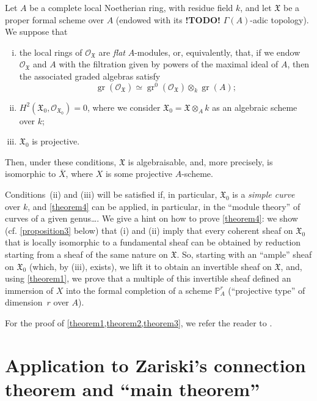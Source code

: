 \documentclass{article}
\theoremstyle{plain}
\newenvironment{theorem}[1]
  {\renewcommand\theinnercustomtheorem{#1}\innercustomtheorem}
  {\endinnercustomtheorem}
\theoremstyle{definition}
\newcommand{\sh}{\mathscr}
\newcommand{\fk}{\mathfrak}
\newcommand{\PP}{\mathbb{P}}
\DeclareMathOperator{\gr}{gr}
\newcommand{\todo}{\textbf{ !TODO! }}
\newcommand{\oldpage}[1]{\marginpar{\footnotesize$\Big\vert$ \textit{p.~#1}}}
\begin{document}
\begin{theorem}{4}
\label{theorem4}
  Let $A$ be a complete local Noetherian ring, with residue field $k$, and let $\fk{X}$ be a proper formal scheme over $A$ (endowed with its \todo $\Gamma(A)$-adic topology).
  We suppose that
  \begin{enumerate}[i.]
    \item the local rings of $\sh{O}_{\fk{X}}$ are \emph{flat} $A$-modules, or, equivalently, that, if we endow $\sh{O}_{\fk{X}}$ and $A$ with the filtration given by powers of the maximal ideal of $A$, then the associated graded algebras satisfy
      \[
        \gr(\sh{O}_{\fk{X}}) \simeq \gr^0(\sh{O}_{\fk{X}})\otimes_k\gr(A);
      \]
    \item $H^2(\fk{X}_0,\sh{O}_{\fk{X}_0})=0$, where we consider $\fk{X}_0=\fk{X}\otimes_Ak$ as an algebraic scheme over $k$;
\oldpage{182-07}
    \item $\fk{X}_0$ is projective.
  \end{enumerate}
  Then, under these conditions, $\fk{X}$ is algebraisable, and, more precisely, is isomorphic to $\overline{X}$, where $X$ is some projective $A$-scheme.
\end{theorem}

Conditions~(ii) and (iii) will be satisfied if, in particular, $\fk{X}_0$ is a \emph{simple curve} over $k$, and \cref{theorem4} can be applied, in particular, in the ``module theory'' of curves of a given genus\ldots.
We give a hint on how to prove \cref{theorem4}:
we show (cf. \cref{proposition3} below) that (i) and (ii) imply that every coherent sheaf on $\fk{X}_0$ that is locally isomorphic to a fundamental sheaf can be obtained by reduction starting from a sheaf of the same nature on $\fk{X}$.
So, starting with an ``ample'' sheaf on $\fk{X}_0$ (which, by (iii), exists), we lift it to obtain an invertible sheaf on $\fk{X}$, and, using \cref{theorem1}, we prove that a multiple of this invertible sheaf defined an immersion of $X$ into the formal completion of a scheme $\PP_A^r$ (``projective type'' of dimension~$r$ over $A$).

For the proof of \cref{theorem1,theorem2,theorem3}, we refer the reader to \cite{1}.


\section{Application to Zariski's connection theorem and ``main theorem''}
\label{section4}
\end{document}

